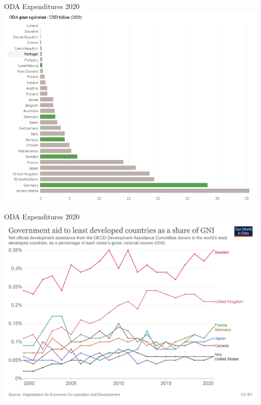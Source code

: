\documentclass[handout]{beamer}
\begin{document}
\begin{frame}{\LARGE ODA Expenditures 2020}
	\centering
	\includegraphics[width=\textwidth,height=.9\textheight,keepaspectratio]{ODAinUSD2020.png}
\end{frame}

\begin{frame}{\LARGE ODA Expenditures 2020}
    \centering
\includegraphics[width=\textwidth,height=.9\textheight,keepaspectratio]{ODAinGNI2020.png}
\end{frame}
\end{document}

